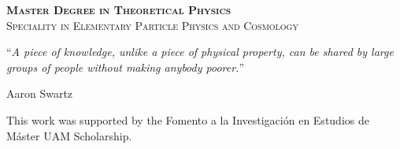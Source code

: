 \documentclass[
11pt, %
oneside, %
english, %
singlespacing, %
headsepline, %
consistentlayout, %
]{MastersDoctoralThesis} %
\begin{document}
\begin{titlepage}
\begin{center}
\vfill

{\scshape \textbf{Master Degree in Theoretical Physics}}\\
{\scshape Speciality in Elementary Particle Physics and Cosmology}\\%

 

\end{center}
\end{titlepage}


\vspace*{0.2\textheight}

\noindent\enquote{\itshape A piece of knowledge, unlike a piece of physical property, can be shared by large groups of people without making anybody poorer.}\bigbreak

\hfill Aaron Swartz


\begin{acknowledgements}
	\addchaptertocentry{\acknowledgementname} %
	This work was supported by the Fomento a la Investigación en Estudios de Máster UAM Scholarship.
\end{acknowledgements}


\begin{abstract}
\addchaptertocentry{\abstractname} %

\end{abstract}



\tableofcontents %

\end{document}
